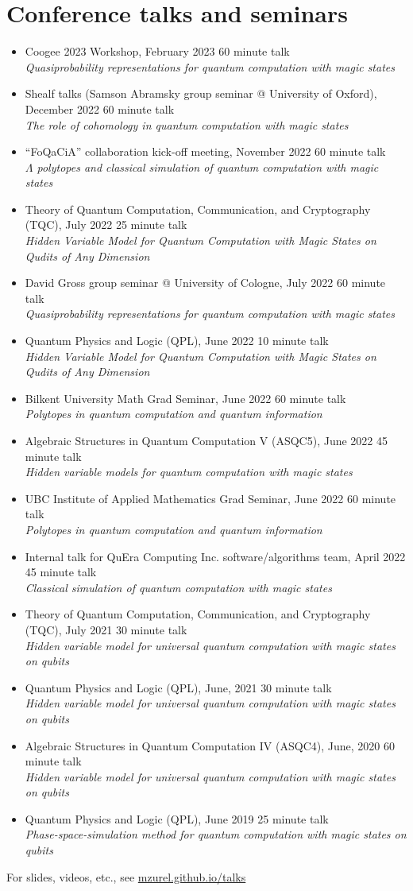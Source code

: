 \documentclass[letterpaper,11pt]{article}
\newcommand{\ConferenceItem}[3]{
	\item{\parbox{0.97\textwidth}{
		{#1}  \hfill {#2}\\
		\emph{#3}
	}}
}
\begin{document}
\section*{Conference talks and seminars}
\begin{itemize}[leftmargin=*]
	\ConferenceItem{Coogee 2023 Workshop, February 2023}{60 minute talk}{Quasiprobability representations for quantum computation with magic states}
	
	\ConferenceItem{Shealf talks (Samson Abramsky group seminar @ University of Oxford), December 2022}{60 minute talk}{The role of cohomology in quantum computation with magic states}
	
	\ConferenceItem{``FoQaCiA'' collaboration kick-off meeting, November 2022}{60 minute talk}{$\Lambda$ polytopes and classical simulation of quantum computation with magic states}
	
	\ConferenceItem{Theory of Quantum Computation, Communication, and Cryptography (TQC), July 2022}{25 minute talk}{Hidden Variable Model for Quantum Computation with Magic States on Qudits of Any Dimension}
	
	\ConferenceItem{David Gross group seminar @ University of Cologne, July 2022}{60 minute talk}{Quasiprobability representations for quantum computation with magic states}
	
	\ConferenceItem{Quantum Physics and Logic (QPL), June 2022}{10 minute talk}{Hidden Variable Model for Quantum Computation with Magic States on Qudits of Any Dimension}
	
	\ConferenceItem{Bilkent University Math Grad Seminar, June 2022}{60 minute talk}{Polytopes in quantum computation and quantum information}
	
	\ConferenceItem{Algebraic Structures in Quantum Computation V (ASQC5), June 2022}{45 minute talk}{Hidden variable models for quantum computation with magic states}
	
	\ConferenceItem{UBC Institute of Applied Mathematics Grad Seminar, June 2022}{60 minute talk}{Polytopes in quantum computation and quantum information}
	
	\ConferenceItem{Internal talk for QuEra Computing Inc. software/algorithms team, April 2022}{45 minute talk}{Classical simulation of quantum computation with magic states}
	
	\ConferenceItem{Theory of Quantum Computation, Communication, and Cryptography (TQC), July 2021}{30 minute talk}{Hidden variable model for universal quantum computation with magic states on qubits}
	
	\ConferenceItem{Quantum Physics and Logic (QPL), June, 2021}{30 minute talk}{Hidden variable model for universal quantum computation with magic states on qubits}
	
	\ConferenceItem{Algebraic Structures in Quantum Computation IV (ASQC4), June, 2020}{60 minute talk}{Hidden variable model for universal quantum computation with magic states on qubits}
	
	\ConferenceItem{Quantum Physics and Logic (QPL), June 2019}{25 minute talk}{Phase-space-simulation method for quantum computation with magic states on qubits}
\end{itemize}
For slides, videos, etc., see \href{https://mzurel.github.io/talks}{mzurel.github.io/talks}
\end{document}
